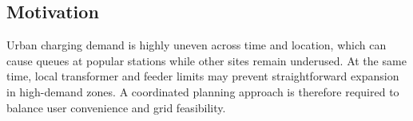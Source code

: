 \subsection{Motivation}
\label{subsec:motivation}
Urban charging demand is highly uneven across time and location, which can cause queues at popular stations while other sites remain underused. At the same time, local transformer and feeder limits may prevent straightforward expansion in high-demand zones. A coordinated planning approach is therefore required to balance user convenience and grid feasibility.
